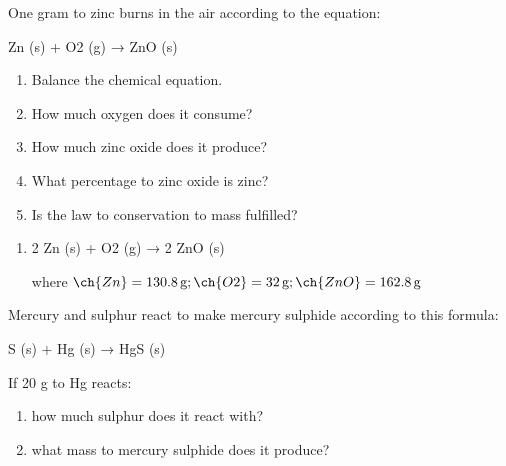 \begin{exercise}
    One gram to zinc burns in the air according to the equation:
    \begin{reaction*}
        Zn (s) + O2 (g) → ZnO (s)
    \end{reaction*}
    \begin{enumerate}[label=\letraminuscula]
        \item Balance the chemical equation.
        \item How much oxygen does it consume?
        \item How much zinc oxide does it produce?
        \item What percentage to zinc oxide is zinc?
        \item Is the law to conservation to mass fulfilled?
    \end{enumerate}
    \begin{solu}
        \begin{enumerate}[label=\letraminuscula]
            \item \begin{reaction*}
                      2 Zn (s) + O2 (g) → 2 ZnO (s)
            \end{reaction*}
            where \( \ch{Zn} = \qty{130.8}{\g}; \ch{O2} = \qty{32}{\g}; \ch{ZnO} = \qty{162.8}{\g} \)
        \end{enumerate}
    \end{solu}
\end{exercise}

\begin{exercise}
    Mercury and sulphur react to make mercury sulphide according to this formula:
    \begin{reaction*}
        S (s) + Hg (s) → HgS (s)
    \end{reaction*}
    If 20 g to Hg reacts:
    \begin{enumerate}[label=\letraminuscula]
        \item how much sulphur does it react with?
        \item what mass to mercury sulphide does it
        produce?
    \end{enumerate}
    \begin{solu}

    \end{solu}
\end{exercise}


